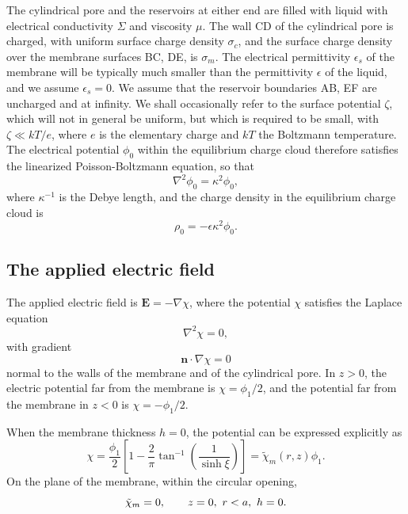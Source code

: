 The cylindrical pore and the reservoirs at either end are filled with liquid with electrical conductivity $\Sigma$ and viscosity $\mu$. The wall CD of the cylindrical pore is charged, with uniform surface charge density $\sigma_c$, and the surface charge density
over the membrane surfaces BC, DE, is $\sigma_m$. The electrical permittivity $\epsilon_s$ of the membrane will be typically much
smaller than the permittivity $\epsilon$ of the liquid, and we assume $\epsilon_s=0$. We assume that the reservoir boundaries AB, EF are uncharged and at infinity. We shall occasionally refer to the surface potential $\zeta$, which will not in general be uniform, but which is required to be small, with $\zeta\ll kT/e$, where $e$ is the elementary charge and $kT$ the Boltzmann temperature. The electrical potential $\phi_0$ within the equilibrium charge cloud therefore satisfies the linearized Poisson-Boltzmann equation, so that
\begin{equation}
\nabla^2\phi_0=\kappa^2\phi_0,
\label{eq:linear_poisson_boltzmann_eqn}
\end{equation}
where $\kappa^{-1}$ is the Debye length, and the charge density in the equilibrium charge cloud is
\begin{equation}
\rho_0=-\epsilon\kappa^2\phi_0.
\end{equation}

\subsection{The applied electric field}
\label{subsec:finite_composite}
The applied electric field is
$\mathbf{E}=-\nabla\chi$,
where the potential $\chi$ satisfies the Laplace equation
\begin{equation}
\nabla^2\chi=0,
\end{equation}
with gradient
\begin{equation}
\mathbf{n} \cdot \nabla\chi=0
\end{equation}
normal to the walls of the membrane and of the cylindrical pore. In $z>0$, the electric potential far from the membrane is $\chi=\phi_1/2$, and the potential far from the membrane in $z<0$ is $\chi=-\phi_1/2$.

When the membrane thickness $h=0$, the potential can be expressed explicitly as \cite{M&F}
\begin{equation}
\chi=\frac{\phi_1}{2}\left\lbrack 1-\frac{2}{\pi}
\tan^{-1}\left(\frac{1}{\sinh\xi}\right)\right\rbrack
=\tilde\chi_m(r,z)\phi_1.
\label{chi_m}
\end{equation}
On the plane of the membrane, within the circular opening,
\begin{equation}
\tilde\chi_m=0,\hskip 20pt z=0,\ r<a,\ h=0.
\label{chi_m_z0}
\end{equation}

